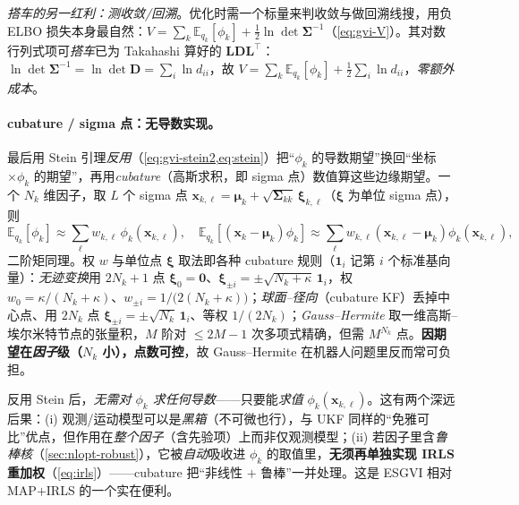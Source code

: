 \emph{搭车的另一红利：测收敛/回溯}。优化时需一个标量来判收敛与做回溯线搜，用负 ELBO 损失本身最自然：$V=\sum_k\mathbb{E}_{q_k}[\phi_k]+\tfrac12\ln\det\boldsymbol{\Sigma}^{-1}$（\cref{eq:gvi-V}）。其对数行列式项可\emph{搭车}已为 Takahashi 算好的 $\mathbf{L}\mathbf{D}\mathbf{L}^\top$：$\ln\det\boldsymbol{\Sigma}^{-1}=\ln\det\mathbf{D}=\sum_i\ln d_{ii}$，故 $V=\sum_k\mathbb{E}_{q_k}[\phi_k]+\tfrac12\sum_i\ln d_{ii}$，\emph{零额外成本}。

\paragraph{cubature / sigma 点：无导数实现。}
最后用 Stein 引理\emph{反用}（\cref{eq:gvi-stein2,eq:stein}）把“$\phi_k$ 的导数期望”换回“坐标$\times\phi_k$ 的期望”，再用\emph{cubature}（高斯求积，即 sigma 点）数值算这些边缘期望。一个 $N_k$ 维因子，取 $L$ 个 sigma 点 $\mathbf{x}_{k,\ell}=\boldsymbol{\mu}_k+\sqrt{\boldsymbol{\Sigma}_{kk}}\,\boldsymbol{\xi}_{k,\ell}$（$\boldsymbol{\xi}$ 为单位 sigma 点），则
\begin{equation}
  \mathbb{E}_{q_k}[\phi_k]\approx\sum_{\ell}w_{k,\ell}\,\phi_k(\mathbf{x}_{k,\ell}),\quad
  \mathbb{E}_{q_k}[(\mathbf{x}_k-\boldsymbol{\mu}_k)\phi_k]\approx\sum_{\ell}w_{k,\ell}(\mathbf{x}_{k,\ell}-\boldsymbol{\mu}_k)\phi_k(\mathbf{x}_{k,\ell}),
  \label{eq:gvi-cubature}
\end{equation}
二阶矩同理。权 $w$ 与单位点 $\boldsymbol{\xi}$ 取法即各种 cubature 规则（$\mathbf{1}_i$ 记第 $i$ 个标准基向量）：\emph{无迹变换}用 $2N_k{+}1$ 点 $\boldsymbol{\xi}_0=\mathbf{0}$、$\boldsymbol{\xi}_{\pm i}=\pm\sqrt{N_k+\kappa}\,\mathbf{1}_i$，权 $w_0=\kappa/(N_k+\kappa)$、$w_{\pm i}=1/\!\big(2(N_k+\kappa)\big)$；\emph{球面--径向}（cubature KF）丢掉中心点、用 $2N_k$ 点 $\boldsymbol{\xi}_{\pm i}=\pm\sqrt{N_k}\,\mathbf{1}_i$、等权 $1/(2N_k)$；\emph{Gauss--Hermite} 取一维高斯--埃尔米特节点的张量积，$M$ 阶对 $\le2M{-}1$ 次多项式精确，但需 $M^{N_k}$ 点。\textbf{因期望在\emph{因子}级（$N_k$ 小），点数可控}，故 Gauss--Hermite 在机器人问题里反而常可负担。

\begin{insight}
反用 Stein 后，\emph{无需对 $\phi_k$ 求任何导数}——只要能\emph{求值} $\phi_k(\mathbf{x}_{k,\ell})$。这有两个深远后果：(i) 观测/运动模型可以是\emph{黑箱}（不可微也行），与 UKF 同样的“免雅可比”优点，但作用在\emph{整个因子}（含先验项）上而非仅观测模型；(ii) 若因子里含\emph{鲁棒核}（\cref{sec:nlopt-robust}），它被\emph{自动}吸收进 $\phi_k$ 的取值里，\textbf{无须再单独实现 IRLS 重加权}（\cref{eq:irls}）——cubature 把“非线性 $+$ 鲁棒”一并处理。这是 ESGVI 相对 MAP$+$IRLS 的一个实在便利。
\end{insight}

